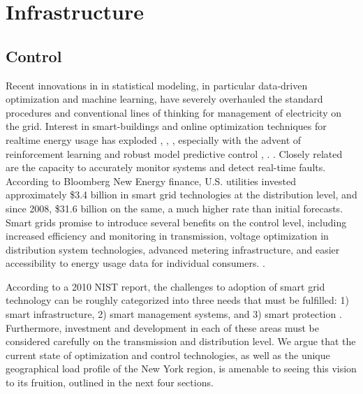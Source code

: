 \documentclass[plain]{article}
\newcommand{\1}{\mathbbm{1}}
\begin{document}
\section{Infrastructure}

\subsection{Control}
Recent innovations in in statistical modeling, in particular data-driven optimization and machine learning, have severely overhauled the standard procedures and conventional lines of thinking for management of electricity on the grid. Interest in smart-buildings and online optimization techniques for realtime energy usage has exploded \cite{yu_review_2021}, \cite{khan_modeling_2022}, \cite{sembroiz_planning_2019}, especially with the advent of reinforcement learning and robust model predictive control \cite{chen_efficient_2020}, \cite{yang_adaptive_2019}. . Closely related are the capacity to accurately monitor systems and detect real-time faults. According to Bloomberg New Energy finance, U.S. utilities invested approximately  \$3.4 billion in smart grid technologies at the distribution level, and since 2008, \$31.6 billion on the same, a much higher rate than initial forecasts. Smart grids promise to introduce several benefits on the control level, including increased efficiency and monitoring in transmission, voltage optimization in distribution system technologies, advanced metering infrastructure, and easier accessibility to energy usage data for individual consumers. \cite{cite energy.gov}. 


According to a 2010 NIST report, the challenges to adoption of smart grid technology can be roughly categorized into three needs that must be fulfilled: 1) smart infrastructure, 2) smart management systems, and 3) smart protection \cite{moreno_escobar_comprehensive_2021-1}. Furthermore, investment and development in each of these areas must be considered carefully on the transmission and distribution level. We argue that the current state of optimization and control technologies, as well as the unique geographical load profile of the New York region, is amenable to seeing this vision to its fruition, outlined in the next four sections.
\end{document}
